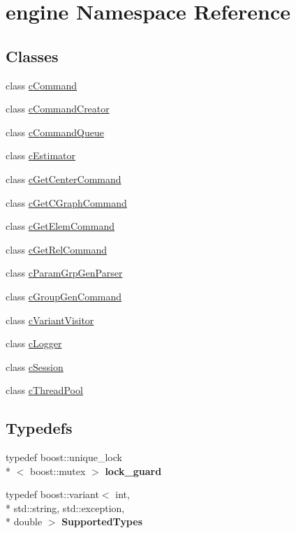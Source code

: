 \hypertarget{namespaceengine}{\section{engine Namespace Reference}
\label{namespaceengine}
}
\subsection*{Classes}
\begin{DoxyCompactItemize}
\item 
class \hyperlink{classengine_1_1cCommand}{c\-Command}
\item 
class \hyperlink{classengine_1_1cCommandCreator}{c\-Command\-Creator}
\item 
class \hyperlink{classengine_1_1cCommandQueue}{c\-Command\-Queue}
\item 
class \hyperlink{classengine_1_1cEstimator}{c\-Estimator}
\item 
class \hyperlink{classengine_1_1cGetCenterCommand}{c\-Get\-Center\-Command}
\item 
class \hyperlink{classengine_1_1cGetCGraphCommand}{c\-Get\-C\-Graph\-Command}
\item 
class \hyperlink{classengine_1_1cGetElemCommand}{c\-Get\-Elem\-Command}
\item 
class \hyperlink{classengine_1_1cGetRelCommand}{c\-Get\-Rel\-Command}
\item 
class \hyperlink{classengine_1_1cParamGrpGenParser}{c\-Param\-Grp\-Gen\-Parser}
\item 
class \hyperlink{classengine_1_1cGroupGenCommand}{c\-Group\-Gen\-Command}
\item 
class \hyperlink{classengine_1_1cVariantVisitor}{c\-Variant\-Visitor}
\item 
class \hyperlink{classengine_1_1cLogger}{c\-Logger}
\item 
class \hyperlink{classengine_1_1cSession}{c\-Session}
\item 
class \hyperlink{classengine_1_1cThreadPool}{c\-Thread\-Pool}
\end{DoxyCompactItemize}
\subsection*{Typedefs}
\begin{DoxyCompactItemize}
\item 
\hypertarget{namespaceengine_af1b349928e8ef52af7a7b83676140e9d}{typedef boost\-::unique\-\_\-lock\\*
$<$ boost\-::mutex $>$ {\bfseries lock\-\_\-guard}}\label{namespaceengine_af1b349928e8ef52af7a7b83676140e9d}

\item 
\hypertarget{namespaceengine_a942a6c5eb4358a465a03cbf32bd4546e}{typedef boost\-::variant$<$ int, \\*
std\-::string, std\-::exception, \\*
double $>$ {\bfseries Supported\-Types}}\label{namespaceengine_a942a6c5eb4358a465a03cbf32bd4546e}

\end{DoxyCompactItemize}
